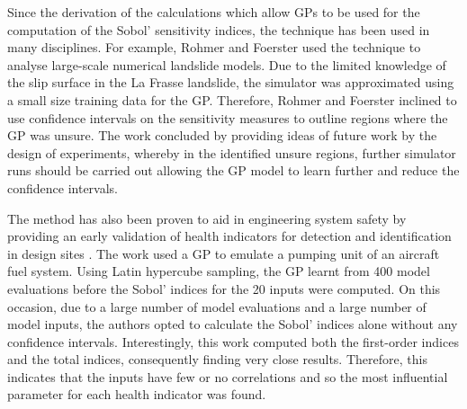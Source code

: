 \documentclass[preprint,12pt]{elsarticle}
\begin{document}
	Since the derivation of the calculations which allow GPs to be used for the computation of the Sobol' sensitivity indices, the technique has been used in many disciplines. For example, Rohmer and Foerster \cite{Rohmer2011} used the technique to analyse large-scale numerical landslide models. Due to the limited knowledge of the slip surface in the La Frasse landslide, the simulator was approximated using a small size training data for the GP. Therefore, Rohmer and Foerster inclined to use confidence intervals on the sensitivity measures to outline regions where the GP was unsure. The work concluded by providing ideas of future work by the design of experiments, whereby in the identified unsure regions, further simulator runs should be carried out allowing the GP model to learn further and reduce the confidence intervals.
	
	The method has also been proven to aid in engineering system safety by providing an early validation of health indicators for detection and identification in design sites \cite{Lamoureux2014}. The work used a GP to emulate a pumping unit of an aircraft fuel system. Using Latin hypercube sampling, the GP learnt from 400 model evaluations before the Sobol' indices for the 20 inputs were computed. On this occasion, due to a large number of model evaluations and a large number of model inputs, the authors opted to calculate the Sobol' indices alone without any confidence intervals. Interestingly, this work computed both the first-order indices and the total indices, consequently finding very close results. Therefore, this indicates that the inputs have few or no correlations and so the most influential parameter for each health indicator was found.
	
\end{document}
